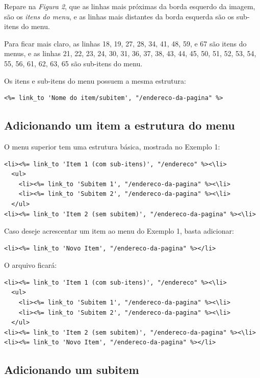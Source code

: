 Repare na \emph{Figura 2}, que as linhas mais próximas da borda esquerdo da imagem, são os \emph{itens do menu}, e as linhas mais distantes da borda esquerda são os sub-itens do menu.

Para ficar mais claro, as linhas 18, 19, 27, 28, 34, 41, 48, 59, e 67 são itens do menus, e as linhas 21, 22, 23, 24, 30, 31, 36, 37, 38, 43, 44, 45, 50, 51, 52, 53, 54, 55, 56, 61, 62, 63, 65 são sub-itens do menu.

Os itens e sub-itens do menu possuem a mesma estrutura:

\begin{verbatim}
<%= link_to 'Nome do item/subitem', "/endereco-da-pagina" %>
\end{verbatim}

\subsection{Adicionando um item a estrutura do menu}

O menu superior tem uma estrutura básica, mostrada no Exemplo 1:

\begin{verbatim}
<li><%= link_to 'Item 1 (com sub-itens)', "/endereco" %><\li>
  <ul>
    <li><%= link_to 'Subitem 1', "/endereco-da-pagina" %><\li>
    <li><%= link_to 'Subitem 2', "/endereco-da-pagina" %><\li>
  </ul>
<li><%= link_to 'Item 2 (sem subitem)', "/endereco-da-pagina" %><\li>
\end{verbatim}

Caso deseje acrescentar um item ao menu do Exemplo 1, basta adicionar:

\begin{verbatim}
<li><%= link_to 'Novo Item', "/endereco-da-pagina" %></li>
\end{verbatim}

O arquivo ficará:

\begin{verbatim}
<li><%= link_to 'Item 1 (com sub-itens)', "/endereco" %><\li>
  <ul>
    <li><%= link_to 'Subitem 1', "/endereco-da-pagina" %><\li>
    <li><%= link_to 'Subitem 2', "/endereco-da-pagina" %><\li>
  </ul>
<li><%= link_to 'Item 2 (sem subitem)', "/endereco-da-pagina" %><\li>
<li><%= link_to 'Novo Item', "/endereco-da-pagina" %></li>
\end{verbatim}

\subsection{Adicionando um subitem}

